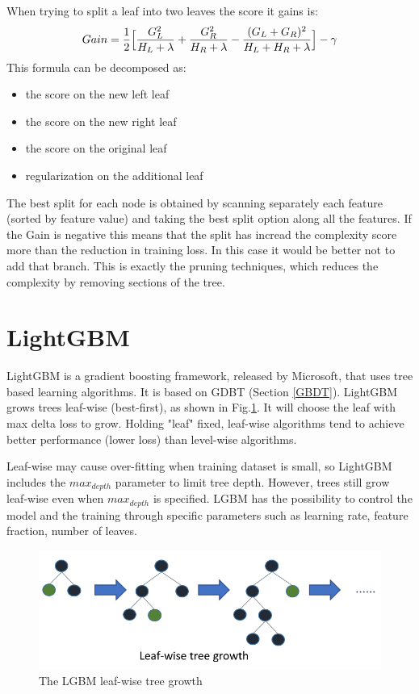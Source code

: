 \documentclass[a4paper, oneside, 11pt, openright]{book}
\begin{document}
			When trying to split a leaf into two leaves the score it gains is:
			\begin{equation}
				Gain = \frac{1}{2}\Bigl[\dfrac{G_L^2}{H_L+\lambda} + \dfrac{G_R^2}{H_R+\lambda} - \dfrac{(G_L+G_R)^2}{H_L+H_R+\lambda}\Bigr] - \gamma
			\end{equation}
			This formula can be decomposed as:
			\begin{itemize}
				\item the score on the new left leaf
				\item the score on the new right leaf
				\item the score on the original leaf
				\item regularization on the additional leaf
			\end{itemize} 
			The best split for each node is obtained by scanning separately each feature (sorted by feature value) and taking the best split option along all the features. If the Gain is negative this means that the split has incread the complexity score more than the reduction in training loss. In this case it would be better not to add that branch. This is exactly the pruning techniques, which reduces the complexity by removing sections of the tree.
		\section{LightGBM}
		LightGBM \cite{LGBM} is a gradient boosting framework, released  by Microsoft, that uses tree based learning algorithms. It is based on GDBT (Section \ref{GBDT}). LightGBM grows trees leaf-wise (best-first), as shown in Fig.\ref{fig:LGBM tree}. It will choose the leaf with max delta loss to grow. Holding "leaf" fixed, leaf-wise algorithms tend to achieve better performance (lower loss) than level-wise algorithms.
		
		Leaf-wise may cause over-fitting when training dataset is small, so LightGBM includes the $max_{depth}$ parameter to limit tree depth. However, trees still grow leaf-wise even when $max_{depth}$ is specified. LGBM has the possibility to control the model and the training through specific parameters such as learning rate, feature fraction, number of leaves.
		\begin{figure}
			\centering
			\includegraphics[width=0.5\textheight]{tesi_images/LGBM.png}
			\caption{The LGBM leaf-wise tree growth}
			\label{fig:LGBM tree}
		\end{figure}
	
\end{document}
